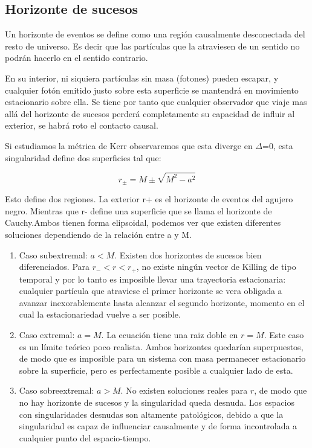 \documentclass{article}
\begin{document}
\subsection{Horizonte de sucesos}

Un horizonte de eventos se define como una región causalmente desconectada del resto de universo. Es decir que las partículas que la atraviesen de un sentido no podrán hacerlo en el sentido contrario.\cite{borghiagujeros}

En su interior, ni siquiera partículas sin masa (fotones) pueden escapar, y cualquier fotón emitido justo sobre esta superficie se mantendrá en movimiento estacionario sobre ella.
Se tiene por tanto que cualquier observador que viaje mas allá del horizonte de sucesos perderá completamente su capacidad de influir al exterior, se habrá roto el contacto causal.\cite{jeffersonagujeros}

Si estudiamos la métrica de Kerr observaremos que esta diverge en $\Delta$=0, esta singularidad define dos superficies tal que: \cite{borghiagujeros}

\begin{equation}
    r_{\pm}=M \pm \sqrt{M^{2}-a^{2}}
\end{equation}

Esto define dos regiones. La exterior r+ es el horizonte de eventos del agujero negro. Mientras que r- define una superficie que se llama el horizonte de Cauchy.\cite{borghiagujeros}Ambos tienen forma elipsoidal, podemos ver que existen diferentes soluciones dependiendo de la relación entre a y M.\cite{jeffersonagujeros}

\begin{enumerate}
    \item Caso subextremal: $a < M$. Existen dos horizontes de sucesos bien diferenciados.
    Para $r_{-} < r < r_{+}$, no existe ningún vector de Killing de tipo temporal y por lo tanto es imposible llevar una trayectoria estacionaria: cualquier partícula que atraviese el primer horizonte se vera obligada a avanzar inexorablemente hasta alcanzar el segundo horizonte, momento en el cual la estacionariedad vuelve a ser posible.\cite{jeffersonagujeros}
    \item Caso extremal: $a = M$. La ecuación tiene una raiz doble en $r = M$. Este caso es un límite teórico poco realista. Ambos horizontes quedarían superpuestos, de modo que es imposible para un sistema con masa permanecer estacionario sobre la superficie, pero es perfectamente posible a cualquier lado de esta.\cite{jeffersonagujeros}
    \item Caso sobreextremal: $a > M$. No existen soluciones reales para $r$, de modo que no hay horizonte de sucesos y la singularidad queda desnuda. Los espacios con singularidades desnudas son altamente patológicos, debido a que la singularidad es capaz de influenciar causalmente y de forma incontrolada a cualquier punto del espacio-tiempo.\cite{jeffersonagujeros}
\end{enumerate}
\end{document}
